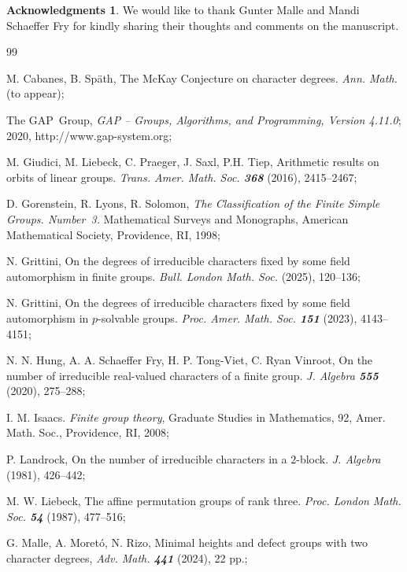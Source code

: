 \documentclass[12pt]{amsart}
\theoremstyle{theorem}
\theoremstyle{definition}
\newtheorem*{ack}{Acknowledgments}
\begin{document}
	\begin{ack}
		We would like to thank Gunter Malle and Mandi Schaeffer Fry for kindly sharing their thoughts and comments on the manuscript.
	\end{ack}
	

	\begin{thebibliography}{99}
		
		 {\sc M. Cabanes, B. Späth}, The McKay Conjecture on character degrees. \emph{Ann. Math.} (to appear);
		
		{\sc The GAP~Group}, \emph{GAP -- Groups, Algorithms, and Programming, Version
			4.11.0}; 2020, {\sf http://www.gap-system.org};
		
		{\sc M. Giudici, M. Liebeck, C. Praeger, J. Saxl, P.H. Tiep}, Arithmetic
		results on orbits of linear groups. \emph{Trans. Amer. Math. Soc. \bf368}
		(2016), 2415--2467;
		
		{\sc D. Gorenstein, R. Lyons, R. Solomon}, \emph{The Classification of the
			Finite Simple Groups. Number~3.} Mathematical Surveys and Monographs,
		American Mathematical Society, Providence, RI, 1998;
		
		{\sc N. Grittini}, On the degrees of irreducible characters fixed by
		some field automorphism in finite groups. \emph{Bull. London Math. Soc.} (2025), 120--136;
		
		{\sc N. Grittini}, On the degrees of irreducible characters fixed by some field automorphism in $p$-solvable groups. \emph{Proc. Amer. Math. Soc. {\bf 151}} (2023), 4143--4151;
		
		{\sc N. N. Hung, A. A. Schaeffer Fry, H. P. Tong-Viet, C. Ryan Vinroot}, On the number of irreducible real-valued characters of a finite group. \emph{J. Algebra \bf555} (2020), 275--288;
		
		{\sc I. M. Isaacs}. \emph{Finite group theory}, Graduate Studies in Mathematics, 92, Amer. Math. Soc., Providence, RI, 2008;
		
		{\sc P. Landrock}, On the number of irreducible characters in a $2$-block. \emph{J. Algebra} (1981), 426--442;
		
		{\sc M. W. Liebeck}, The affine permutation groups of rank three. \emph{Proc.
			London Math. Soc. {\bf54}} (1987), 477--516;
		
		 {\sc G. Malle, A. Moretó, N. Rizo}, Minimal heights and defect groups with two character degrees, \emph{Adv. Math. {\bf 441}} (2024), 22 pp.;
		

\end{thebibliography}
\end{document}
